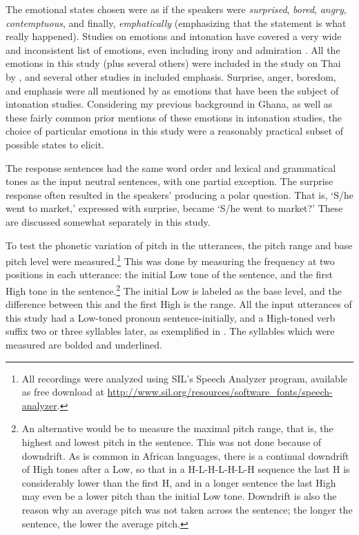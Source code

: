 \documentclass[output=paper]{langsci/langscibook}
\begin{document}
The emotional states chosen were as if the speakers were \emph{surprised}, \emph{bored}, \emph{angry}, \emph{contemptuous}, and finally, \emph{emphatically} (emphasizing that the statement is what really happened). Studies on emotions and intonation have covered a very wide and inconsistent list of emotions, even including irony and admiration \citep[402]{doetal1998}. All the emotions in this study (plus several others) were included in the study on Thai by \citet{luksaneeyanawin1998}, and several other studies in \citet{hirstdicristo1998} included emphasis. Surprise, anger, boredom, and emphasis were all mentioned by \citet{ladd2008} as emotions that have been the subject of intonation studies. Considering my previous background in Ghana, as well as these fairly common prior mentions of these emotions in intonation studies, the choice of particular emotions in this study were a reasonably practical subset of possible states to elicit.

The response sentences had the same word order and lexical and grammatical tones as the input neutral sentences, with one partial exception. The surprise response often resulted in the speakers' producing a polar question. That is, `S/he went to market,' expressed with surprise, became `S/he went to market?' These are discussed somewhat separately in this study. 

To test the phonetic variation of pitch in the utterances, the pitch range and base pitch level were measured.\footnote{All recordings were analyzed using SIL's Speech Analyzer program, available as free download at \url{http://www.sil.org/resources/software_fonts/speech-analyzer}.} This was done by measuring the frequency at two positions in each utterance: the initial Low tone of the sentence, and the first High tone in the sentence.\footnote{An alternative would be to measure the maximal pitch range, that is, the highest and lowest pitch in the sentence. This was not done because of downdrift. As is common in African languages, there is a continual downdrift of High tones after a Low, so that in a H-L-H-L-H-L-H sequence the last H is considerably lower than the first H, and in a longer sentence the last High may even be a lower pitch than the initial Low tone. Downdrift is also the reason why an average pitch was not taken across the sentence; the longer the sentence, the lower the average pitch.} The initial Low is labeled as the base level, and the difference between this and the first High is the range. All the input utterances of this study had a Low-toned pronoun sentence-initially, and a High-toned verb suffix two or three syllables later, as exemplified in . The syllables which were measured are bolded and underlined.
\end{document}
